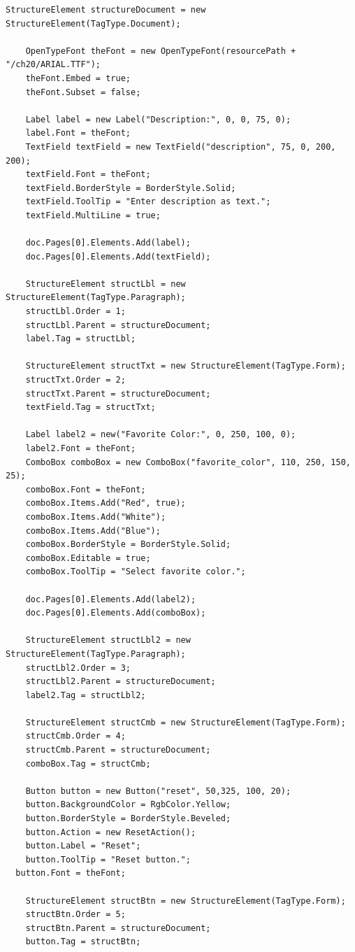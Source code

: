 \documentclass[american,letterpaper]{tufte-book}
\numberwithin{equation}{section}
\numberwithin{figure}{section}
\begin{document}
{{\begin{lstlisting}[caption={Manually tagging a Form.},label={lis:form-Manually-tagging-a},basicstyle={\small\ttfamily},breaklines=true]
    StructureElement structureDocument = new StructureElement(TagType.Document);

    OpenTypeFont theFont = new OpenTypeFont(resourcePath + "/ch20/ARIAL.TTF");
    theFont.Embed = true;
    theFont.Subset = false;

    Label label = new Label("Description:", 0, 0, 75, 0);
    label.Font = theFont;
    TextField textField = new TextField("description", 75, 0, 200, 200);
    textField.Font = theFont;
    textField.BorderStyle = BorderStyle.Solid;
    textField.ToolTip = "Enter description as text.";
    textField.MultiLine = true;

    doc.Pages[0].Elements.Add(label);
    doc.Pages[0].Elements.Add(textField);

    StructureElement structLbl = new StructureElement(TagType.Paragraph);
    structLbl.Order = 1;
    structLbl.Parent = structureDocument;
    label.Tag = structLbl;

    StructureElement structTxt = new StructureElement(TagType.Form);
    structTxt.Order = 2;
    structTxt.Parent = structureDocument;
    textField.Tag = structTxt;

    Label label2 = new("Favorite Color:", 0, 250, 100, 0);
    label2.Font = theFont;
    ComboBox comboBox = new ComboBox("favorite_color", 110, 250, 150, 25);
    comboBox.Font = theFont;
    comboBox.Items.Add("Red", true);
    comboBox.Items.Add("White");
    comboBox.Items.Add("Blue");
    comboBox.BorderStyle = BorderStyle.Solid;
    comboBox.Editable = true;
    comboBox.ToolTip = "Select favorite color.";

    doc.Pages[0].Elements.Add(label2);
    doc.Pages[0].Elements.Add(comboBox);

    StructureElement structLbl2 = new StructureElement(TagType.Paragraph);
    structLbl2.Order = 3;
    structLbl2.Parent = structureDocument;
    label2.Tag = structLbl2;

    StructureElement structCmb = new StructureElement(TagType.Form);
    structCmb.Order = 4;
    structCmb.Parent = structureDocument;
    comboBox.Tag = structCmb;

    Button button = new Button("reset", 50,325, 100, 20);
    button.BackgroundColor = RgbColor.Yellow;
    button.BorderStyle = BorderStyle.Beveled;
    button.Action = new ResetAction();
    button.Label = "Reset";
    button.ToolTip = "Reset button.";
  button.Font = theFont;

    StructureElement structBtn = new StructureElement(TagType.Form);
    structBtn.Order = 5;
    structBtn.Parent = structureDocument;
    button.Tag = structBtn;


\end{lstlisting}}}
\end{document}
